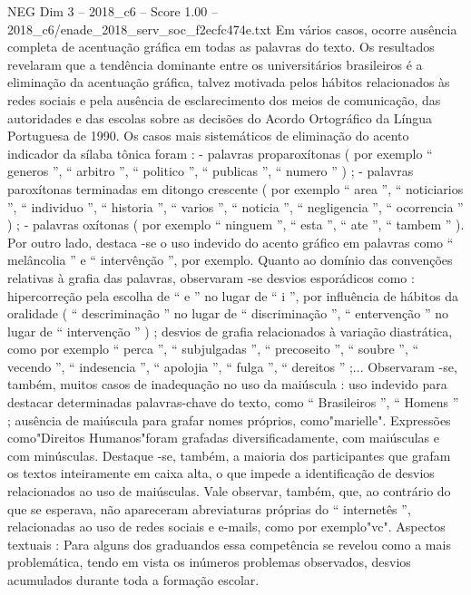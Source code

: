\begin{textsample}{NEG Dim 3 – 2018\_c6 – Score 1.00 – 2018\_c6/enade\_2018\_serv\_soc\_f2ecfc474e.txt}
Em vários casos, ocorre ausência completa de acentuação gráfica em todas as palavras do texto.
Os resultados revelaram que a tendência dominante entre os universitários brasileiros é a eliminação da acentuação gráfica, talvez motivada pelos hábitos relacionados às redes sociais e pela ausência de esclarecimento dos meios de comunicação, das autoridades e das escolas sobre as decisões do Acordo Ortográfico da Língua Portuguesa de 1990.
Os casos mais sistemáticos de eliminação do acento indicador da sílaba tônica foram : - palavras proparoxítonas ( por exemplo “ generos ”, “ arbitro ”, “ politico ”, “ publicas ”, “ numero ” ) ; - palavras paroxítonas terminadas em ditongo crescente ( por exemplo “ area ”, “ noticiarios ”, “ individuo ”, “ historia ”, “ varios ”, “ noticia ”, “ negligencia ”, “ ocorrencia ” ) ; - palavras oxítonas ( por exemplo “ ninguem ”, “ esta ”, “ ate ”, “ tambem ” ).
Por outro lado, destaca -se o uso indevido do acento gráfico em palavras como “ melâncolia ” e “ intervênção ”, por exemplo.
Quanto ao domínio das convenções relativas à grafia das palavras, observaram -se desvios esporádicos como : hipercorreção pela escolha de “ e ” no lugar de “ i ”, por influência de hábitos da oralidade ( “ descriminação ” no lugar de “ discriminação ”, “ entervenção ” no lugar de “ intervenção ” ) ; desvios de grafia relacionados à variação diastrática, como por exemplo “ perca ”, “ subjulgadas ”, “ precoseito ”, “ soubre ”, “ vecendo ”, “ indesencia ”, “ apolojia ”, “ fulga ”, “ dereitos ” ;...
Observaram -se, também, muitos casos de inadequação no uso da maiúscula : uso indevido para destacar determinadas palavras-chave do texto, como “ Brasileiros ”, “ Homens ” ; ausência de maiúscula para grafar nomes próprios, como"marielle".
Expressões como"Direitos Humanos"foram grafadas diversificadamente, com maiúsculas e com minúsculas.
Destaque -se, também, a maioria dos participantes que grafam os textos inteiramente em caixa alta, o que impede a identificação de desvios relacionados ao uso de maiúsculas.
Vale observar, também, que, ao contrário do que se esperava, não apareceram abreviaturas próprias do “ internetês ”, relacionadas ao uso de redes sociais e e-mails, como por exemplo"vc".
Aspectos textuais : Para alguns dos graduandos essa competência se revelou como a mais problemática, tendo em vista os inúmeros problemas observados, desvios acumulados durante toda a formação escolar.

\end{textsample}
